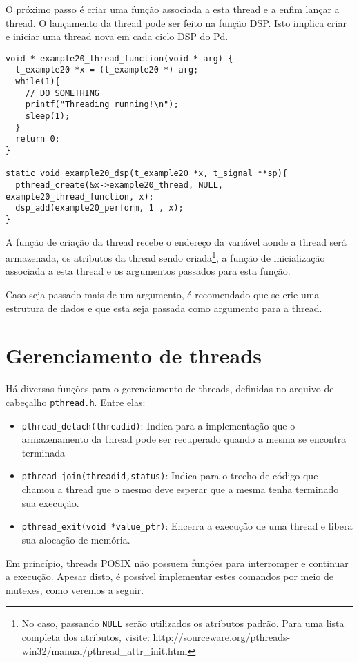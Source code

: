 O próximo passo é criar uma função associada a esta thread e a enfim lançar a
thread. O lançamento da thread pode ser feito na função DSP. Isto implica
criar e iniciar uma thread nova em cada ciclo DSP do Pd.

\begin{lstlisting}
void * example20_thread_function(void * arg) {
  t_example20 *x = (t_example20 *) arg;
  while(1){
    // DO SOMETHING
    printf("Threading running!\n");
    sleep(1);
  }
  return 0;
}

static void example20_dsp(t_example20 *x, t_signal **sp){
  pthread_create(&x->example20_thread, NULL, example20_thread_function, x);
  dsp_add(example20_perform, 1 , x);
}
\end{lstlisting}

A função de criação da thread recebe o endereço da variável aonde a thread
será armazenada, os atributos da thread sendo criada\footnote{No caso,
passando \texttt{NULL} serão utilizados os atributos padrão. Para uma lista
completa dos atributos, visite:
http://sourceware.org/pthreads-win32/manual/pthread\_attr\_init.html}, a
função de inicialização associada a esta thread e os argumentos passados para
esta função. 

Caso seja passado mais de um argumento, é recomendado que se crie uma
estrutura de dados e que esta seja passada como argumento para a thread.

\section{Gerenciamento de threads}

Há diversas funções para o gerenciamento de threads, definidas no arquivo de
cabeçalho \texttt{pthread.h}. Entre elas:

\begin{itemize}
\item \texttt{pthread\_detach(threadid)}: Indica para a implementação que o
armazenamento da thread pode ser recuperado quando a mesma se encontra
terminada
\item \texttt{pthread\_join(threadid,status)}: Indica para o trecho de código
que chamou a thread que o mesmo deve esperar que a mesma tenha terminado sua
execução.
\item \texttt{pthread\_exit(void *value\_ptr)}: Encerra a execução de uma
thread e libera sua alocação de memória.
\end{itemize}

Em princípio, threads POSIX não possuem funções para interromper e continuar a
execução. Apesar disto, é possível implementar estes comandos por meio de
mutexes, como veremos a seguir.

